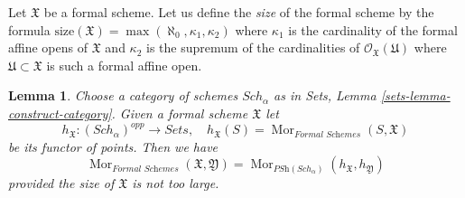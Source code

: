 \documentclass{stacks-project}
\theoremstyle{plain}
\newtheorem{lemma}[subsection]{Lemma}
\theoremstyle{definition}
\theoremstyle{remark}
\numberwithin{equation}{subsection}
\def\Sch{\mathit{Sch}}
\def\Mor{\mathop{\mathrm{Mor}}\nolimits}
\begin{document}
\medskip\noindent
Let $\mathfrak X$ be a formal scheme. Let us define the {\it size}
of the formal scheme by the formula
$\text{size}(\mathfrak X) = \max(\aleph_0, \kappa_1, \kappa_2)$
where $\kappa_1$ is the cardinality of the formal affine opens of
$\mathfrak X$ and $\kappa_2$ is the supremum of the cardinalities
of $\mathcal{O}_\mathfrak X(\mathfrak U)$ where
$\mathfrak U \subset \mathfrak X$ is such a formal affine open.

\begin{lemma}
\label{lemma-fully-faithful}
Choose a category of schemes $\Sch_\alpha$
as in Sets, Lemma \ref{sets-lemma-construct-category}.
Given a formal scheme $\mathfrak X$ let
$$
h_\mathfrak X : (\Sch_\alpha)^{opp} \longrightarrow \textit{Sets},\quad
h_\mathfrak X(S) = \Mor_{\textit{Formal Schemes}}(S, \mathfrak X)
$$
be its functor of points. Then we have
$$
\Mor_{\textit{Formal Schemes}}(\mathfrak X, \mathfrak Y) =
\Mor_{\textit{PSh}(\Sch_\alpha)}(h_\mathfrak X, h_\mathfrak Y)
$$
provided the size of $\mathfrak X$ is not too large.
\end{lemma}
\end{document}
